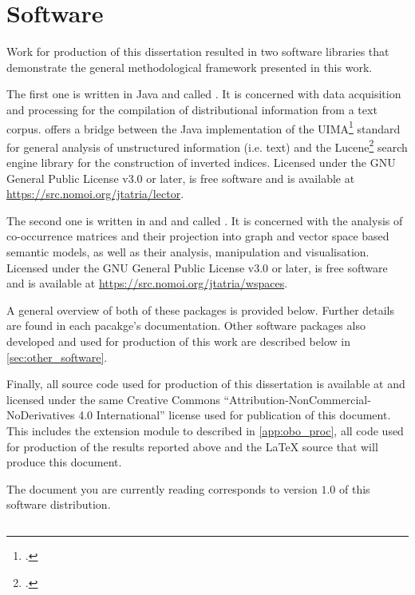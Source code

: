 \chapter{Software}
\label{app:software}

Work for production of this dissertation resulted in two software libraries that demonstrate the general methodological framework presented in this work.

The first one is written in Java and called .
It is concerned with data acquisition and processing for the compilation of distributional information from a text corpus.
 offers a bridge between the Java implementation of the UIMA\footnote{
    \citet{ferrucci2004}.
} standard for general analysis of unstructured information (i.e.  text) and the Lucene\footnote{
    \citet{apacheluceneproject2015}.
} search engine library for the construction of inverted indices.
Licensed under the GNU General Public License v3.0 or later,  is free software and is available at \url{https://src.nomoi.org/jtatria/lector}.

The second one is written in \R{} and \CPP{} and called .
It is concerned with the analysis of co-occurrence matrices and their projection into graph and vector space based semantic models, as well as their analysis, manipulation and visualisation.
Licensed under the GNU General Public License v3.0 or later,  is free software and is available at \url{https://src.nomoi.org/jtatria/wspaces}.

A general overview of both of these packages is provided below.
Further details are found in each pacakge's documentation.
Other software packages also developed and used for production of this work are described below in \autoref{sec:other_software}.

Finally, all source code used for production of this dissertation is available at \url{} and licensed under the same Creative Commons ``Attribution-NonCommercial-NoDerivatives 4.0 International'' license used for publication of this document.
This includes the  extension module to  described in \autoref{app:obo_proc}, all \R{} code used for production of the results reported above and the \LaTeX{} source that will produce this document.

The document you are currently reading corresponds to version $1.0$ of this software distribution.

\section{}

